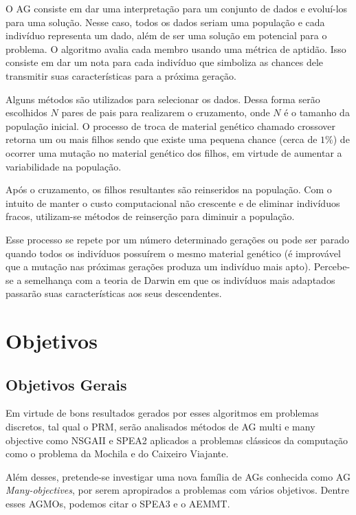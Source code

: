 \documentclass[]{article}
\begin{document}
	O AG consiste em dar uma interpretação para um conjunto de dados e evoluí-los para uma solução. Nesse caso, todos os dados seriam uma população e cada indivíduo representa um dado, além de ser uma solução em potencial para o problema. O algoritmo avalia cada membro usando uma métrica de aptidão. Isso consiste em dar um nota para cada indivíduo que simboliza as chances dele transmitir suas características para a próxima geração.
	
	Alguns métodos são utilizados para selecionar os dados. Dessa forma serão escolhidos $N$ pares de pais para realizarem o cruzamento, onde $N$ é o tamanho da população inicial. O processo de troca de material genético chamado crossover retorna um ou mais filhos sendo que existe uma pequena chance (cerca de $1\%$) de ocorrer uma mutação no material genético dos filhos, em virtude de aumentar a variabilidade na população.
	
	Após o cruzamento, os filhos resultantes são reinseridos na população. Com o intuito de manter o custo computacional não crescente e de eliminar indivíduos fracos, utilizam-se métodos de reinserção para diminuir a população.
	
	Esse processo se repete por um número determinado gerações ou pode ser parado quando todos os indivíduos possuírem o mesmo material genético (é improvável que a mutação nas próximas gerações produza um indivíduo mais apto). 
 	Percebe-se a semelhança com a teoria de Darwin em que os indivíduos mais adaptados passarão suas características aos seus descendentes.
	
\section{Objetivos}
\subsection{Objetivos Gerais}

	Em virtude de bons resultados gerados por esses algoritmos em problemas discretos, tal qual o PRM, serão analisados métodos de AG multi e many objective como NSGAII\cite{NSGAII} e SPEA2\cite{SPEA2} aplicados a problemas clássicos da computação como o problema da Mochila e do Caixeiro Viajante.
	
	Além desses, pretende-se investigar uma nova família de AGs conhecida como AG \textit{Many-objectives}, por serem apropirados a problemas com vários objetivos. Dentre esses AGMOs, podemos citar o SPEA3 e o AEMMT.
	
\end{document}
